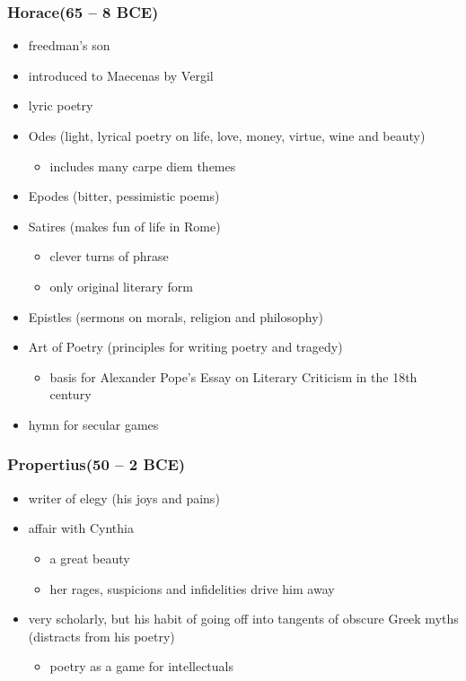 \documentclass[12pt, twoside]{article}
\begin{document}
\subsubsection{Horace(65 – 8 BCE)}
\begin{itemize}
\item freedman's son
\item introduced to Maecenas by Vergil
\item lyric poetry 
\item Odes (light, lyrical poetry on life, love, money, virtue, wine and beauty)
	\begin{itemize}
	\item includes many carpe diem themes
	\end{itemize}
\item Epodes (bitter, pessimistic poems)
\item Satires (makes fun of life in Rome)
	\begin{itemize}
	\item clever turns of phrase
	\item only original literary form
	\end{itemize}
\item Epistles (sermons on morals, religion and philosophy)
\item Art of Poetry (principles for writing poetry and tragedy)
	\begin{itemize}
	\item basis for Alexander Pope’s Essay on Literary Criticism in the 18th century
	\end{itemize}
\item hymn for secular games
\end{itemize}

\subsubsection{Propertius(50 – 2 BCE)}
\begin{itemize}
\item writer of elegy (his joys and pains)
\item affair with Cynthia
	\begin{itemize}
	\item a great beauty
	\item her rages, suspicions and infidelities drive him away
	\end{itemize}
\item very scholarly, but his habit of going off into tangents of obscure Greek myths (distracts from his poetry)
	\begin{itemize}
	\item poetry as a game for intellectuals
	\end{itemize}
\end{itemize}
\end{document}
